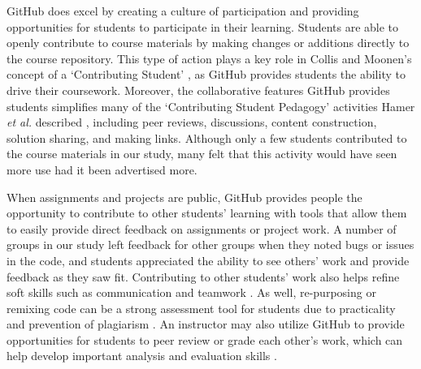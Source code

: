 GitHub does excel by creating a culture of participation \cite{jenkins2009confronting} and providing opportunities for students to participate in their learning. Students are able to openly contribute to course materials by making changes or additions directly to the course repository. This type of action plays a key role in Collis and Moonen's concept of a `Contributing Student' \cite{collis2006contributing}, as GitHub provides students the ability to drive their coursework. Moreover, the collaborative features GitHub provides students simplifies many of the `Contributing Student Pedagogy' activities Hamer \textit{et al.} described \cite{hamer2011tools}, including peer reviews, discussions, content construction, solution sharing, and making links. Although only a few students contributed to the course materials in our study, many felt that this activity would have seen more use had it been advertised more.

When assignments and projects are public, GitHub provides people the opportunity to contribute to other students' learning with tools that allow them to easily provide direct feedback on assignments or project work. A number of groups in our study left feedback for other groups when they noted bugs or issues in the code, and students appreciated the ability to see others' work and provide feedback as they saw fit. Contributing to other students' work also helps refine soft skills such as communication and teamwork \cite{hamer2006some}. As well, re-purposing or remixing code can be a strong assessment tool for students due to practicality and prevention of plagiarism \cite{sant2015code}. An instructor may also utilize GitHub to provide opportunities for students to peer review or grade each other's work, which can help develop important analysis and evaluation skills \cite{sondergaard2012collaborative}.


